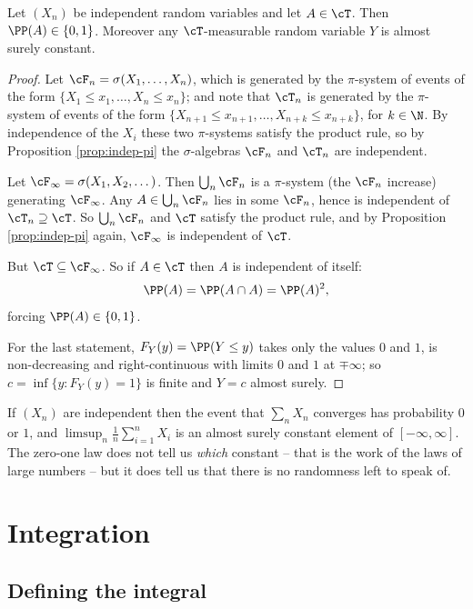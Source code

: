\begin{theorem}\label{thm:kolmogorov01}
	Let $(X_n)$ be independent random variables and let $A \in \cT$. Then $\PP(A) \in \{0,1\}$. Moreover any $\cT$-measurable random variable $Y$ is almost surely constant.
\end{theorem}
\begin{proof}
	Let $\cF_n = \sigma(X_1,\dots,X_n)$, which is generated by the $\pi$-system of events of the form $\{X_1 \leq x_1, \dots, X_n\leq x_n\}$; and note that $\cT_n$ is generated by the $\pi$-system of events of the form $\{X_{n+1}\leq x_{n+1},\dots,X_{n+k}\leq x_{n+k}\}$, for $k \in \N$. By independence of the $X_i$ these two $\pi$-systems satisfy the product rule, so by Proposition \ref{prop:indep-pi} the $\sigma$-algebras $\cF_n$ and $\cT_n$ are independent.

	Let $\cF_\infty = \sigma(X_1, X_2, \dots)$. Then $\bigcup_n \cF_n$ is a $\pi$-system (the $\cF_n$ increase) generating $\cF_\infty$. Any $A \in \bigcup_n \cF_n$ lies in some $\cF_n$, hence is independent of $\cT_n \supseteq \cT$. So $\bigcup_n \cF_n$ and $\cT$ satisfy the product rule, and by Proposition \ref{prop:indep-pi} again, $\cF_\infty$ is independent of $\cT$.

	But $\cT \subseteq \cF_\infty$. So if $A \in \cT$ then $A$ is independent of itself:
	$$
	\PP(A) = \PP(A \cap A) = \PP(A)^2,
	$$
	forcing $\PP(A) \in \{0,1\}$.

	For the last statement, $F_Y(y) = \PP(Y \leq y)$ takes only the values $0$ and $1$, is non-decreasing and right-continuous with limits $0$ and $1$ at $\mp\infty$; so $c = \inf\{y : F_Y(y) = 1\}$ is finite and $Y = c$ almost surely.
\end{proof}

\begin{example}
	If $(X_n)$ are independent then the event that $\sum_n X_n$ converges has probability $0$ or $1$, and $\limsup_n \frac1n \sum_{i=1}^n X_i$ is an almost surely constant element of $[-\infty,\infty]$. The zero-one law does not tell us \emph{which} constant -- that is the work of the laws of large numbers -- but it does tell us that there is no randomness left to speak of.
\end{example}
\section{Integration}

\subsection{Defining the integral}

